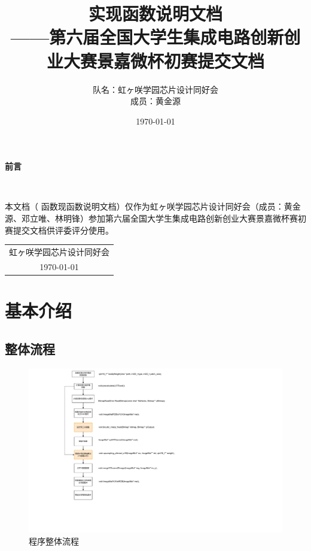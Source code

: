 \documentclass[12pt, a4paper, oneside]{ctexbook}
\title{{\Huge{\textbf{实现函数说明文档}}}\normalsize{\\——第六届全国大学生集成电路创新创业大赛景嘉微杯初赛提交文档}}
\author{队名：虹ヶ咲学园芯片设计同好会\\ 成员：黄金源\space邓立唯\space林明锋}
\date{\today}
\begin{document}
	
	\maketitle	
	\setcounter{page}{1}
	\begin{center}
		\Huge\textbf{前言}
	\end{center}~\

本文档（ 函数现函数说明文档）仅作为虹ヶ咲学园芯片设计同好会（成员：黄金源、邓立唯、林明锋）参加第六届全国大学生集成电路创新创业大赛景嘉微杯赛初赛提交文档供评委评分使用。
	~\\
	\begin{flushright}
		\begin{tabular}{c}
			虹ヶ咲学园芯片设计同好会\\
			\today
		\end{tabular}
	\end{flushright}
	\newpage
	\setcounter{page}{1}
	\tableofcontents
	\newpage
	\setcounter{page}{1}
	
	\chapter{基本介绍}
	\section{整体流程}
		\begin{figure}[h]
			\centering
			\includegraphics[scale=0.65]{pic/overview}
			\caption{程序整体流程}
			\label{fig:overview}
		\end{figure}
\end{document}
